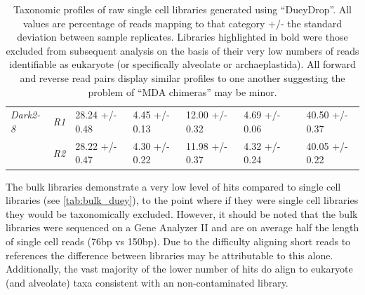\begin{table}[h]
\begin{tabular}{|l|l|l|l|l|l|l|l|}
         \textit{Dark2-8}     & \textit{R1}                   & 28.24 +/- 0.48     & 4.45 +/- 0.13     & 12.00 +/- 0.32     & 4.69 +/- 0.06          &  & 40.50 +/- 0.37      \\ \cmidrule(lr){2-2}
                              & \textit{R2}                   & 28.22 +/- 0.47     & 4.30 +/- 0.22     & 11.98 +/- 0.37     & 4.32 +/- 0.24          &  & 40.05 +/- 0.22      \\ \cmidrule(r){1-6} \cmidrule(l){8-8} 
     \end{tabular}
     \caption{Taxonomic profiles of raw single cell libraries generated using ``DueyDrop''. All values are percentage of reads mapping to that category +/- the standard deviation between sample replicates.  Libraries
     highlighted in bold were those excluded from subsequent analysis on the basis of their very low numbers of reads identifiable as 
 eukaryote (or specifically alveolate or archaeplastida). All forward and reverse read pairs display similar profiles to one another suggesting
 the problem of ``MDA chimeras'' may be minor.}
 \label{tab:sct_duey}
\end{table}

The bulk libraries demonstrate a very low level of hits compared to single cell libraries (see \ref{tab:bulk_duey}), 
to the point where if they were single cell libraries they would be taxonomically excluded. 
However, it should be noted that the bulk libraries were sequenced on a Gene Analyzer II and are on average
half the length of single cell reads (76bp vs 150bp). Due to the difficulty aligning short reads
to references the difference between libraries may be attributable to this alone. 
Additionally, the vast majority of the lower number of hits do align to eukaryote (and alveolate) 
taxa consistent with an non-contaminated library. 


